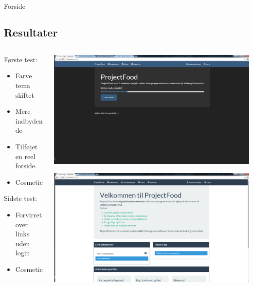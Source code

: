 \begin{frame}{Forside}
	\subsection{Resultater}	
	\begin{minipage}[0.3\textheight]{\textwidth}
		\begin{columns}[T]
			\begin{column}{0.5\textwidth}
				Første test:
				\begin{itemize}
					\item Farve tema skiftet
					\item Mere indbydende
					\item Tilføjet en reel forside.
					\item Cosmetic	
				\end{itemize}	
				Sidste test:
				\begin{itemize}
					\item Forvirret over links uden login
					\item Cosmetic
				\end{itemize}	
			\end{column}	
			\begin{column}{0.5\textwidth}
				 \includegraphics[width=1\textwidth,height=1\textheight,keepaspectratio, trim={1cm 0 0 16mm}, clip]{images/Screenshots/FrontPageOld.png}
	 
	 			\vspace{2 mm}
	  
	 			\includegraphics[width=1\textwidth,height=1\textheight,keepaspectratio, trim={1cm 0 0 16mm}, clip]{images/Screenshots/FrontPage.png}
			\end{column}
	\end{columns}
  \end{minipage}
\end{frame}

